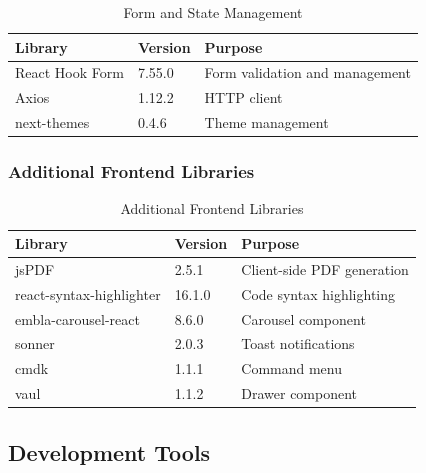 \documentclass[12pt,a4paper]{article}
\begin{document}
    \begin{table}[H]
        \caption{Form and State Management}
        \begin{tabular}{|l|l|p{6cm}|}
            \hline
            \textbf{Library} & \textbf{Version} & \textbf{Purpose} \\
            \hline
            React Hook Form & 7.55.0 & Form validation and management \\
            \hline
            Axios & 1.12.2 & HTTP client \\
            \hline
            next-themes & 0.4.6 & Theme management \\
            \hline
        \end{tabular}
    \end{table}

    \subsubsection{Additional Frontend Libraries}

    \begin{table}[H]
        \caption{Additional Frontend Libraries}
        \begin{tabular}{|l|l|p{6cm}|}
            \hline
            \textbf{Library} & \textbf{Version} & \textbf{Purpose} \\
            \hline
            jsPDF & 2.5.1 & Client-side PDF generation \\
            \hline
            react-syntax-highlighter & 16.1.0 & Code syntax highlighting \\
            \hline
            embla-carousel-react & 8.6.0 & Carousel component \\
            \hline
            sonner & 2.0.3 & Toast notifications \\
            \hline
            cmdk & 1.1.1 & Command menu \\
            \hline
            vaul & 1.1.2 & Drawer component \\
            \hline
        \end{tabular}
    \end{table}

    \subsection{Development Tools}
\end{document}
